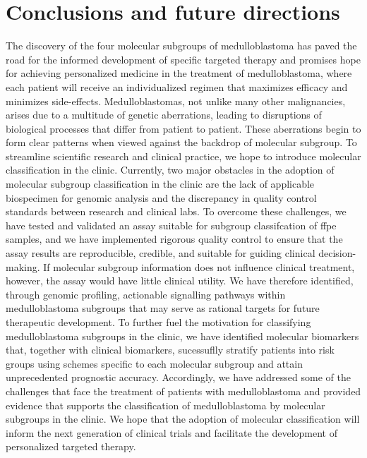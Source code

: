 \chapter{Conclusions and future directions}
\label{ch:conclusions}

The discovery of the four molecular subgroups of medulloblastoma has paved the road for the informed development of specific targeted therapy and promises hope for achieving personalized medicine in the treatment of medulloblastoma, where each patient will receive an individualized regimen that maximizes efficacy and minimizes side-effects. Medulloblastomas, not unlike many other malignancies, arises due to a multitude of genetic aberrations, leading to disruptions of biological processes that differ from patient to patient. These aberrations begin to form clear patterns when viewed against the backdrop of molecular subgroup. To streamline scientific research and clinical practice, we hope to introduce molecular classification in the clinic. Currently, two major obstacles in the adoption of molecular subgroup classification in the clinic are the lack of applicable biospecimen for genomic analysis and the discrepancy in quality control standards between research and clinical labs. To overcome these challenges, we have tested and validated an assay suitable for subgroup classifcation of \gls{ffpe} samples, and we have implemented rigorous quality control to ensure that the assay results are reproducible, credible, and suitable for guiding clinical decision-making. If molecular subgroup information does not influence clinical treatment, however, the assay would have little clinical utility. We have therefore identified, through genomic profiling, actionable signalling pathways within medulloblastoma subgroups that may serve as rational targets for future therapeutic development. To further fuel the motivation for classifying medulloblastoma subgroups in the clinic, we have identified molecular biomarkers that, together with clinical biomarkers, sucessuflly stratify patients into risk groups using schemes specific to each molecular subgroup and attain unprecedented prognostic accuracy. Accordingly, we have addressed some of the challenges that face the treatment of patients with medulloblastoma and provided evidence that supports the classification of medulloblastoma by molecular subgroups in the clinic. We hope that the adoption of molecular classification will inform the next generation of clinical trials and facilitate the development of personalized targeted therapy.

